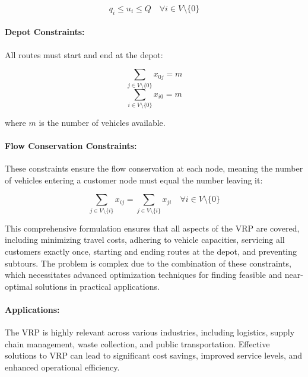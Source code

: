\documentclass{article}
\begin{document}
    \begin{equation}
        q_i \leq u_i \leq Q \quad \forall i \in V \setminus \{0\}
    \end{equation}

    \paragraph{Depot Constraints:}
    All routes must start and end at the depot:

    \begin{equation}
        \sum_{j \in V \setminus \{0\}} x_{0j} = m
    \end{equation}
    \begin{equation}
        \sum_{i \in V \setminus \{0\}} x_{i0} = m
    \end{equation}

    where \( m \) is the number of vehicles available. \cite[pp. 3--5, 62--65]{toth2014vehicle}

    \paragraph{Flow Conservation Constraints:}
    These constraints ensure the flow conservation at each node, meaning the number of vehicles entering a customer node must equal the number leaving it:

    \begin{equation}
        \sum_{j \in V \setminus \{i\}} x_{ij} = \sum_{j \in V \setminus \{i\}} x_{ji} \quad \forall i \in V \setminus \{0\}
    \end{equation}

    This comprehensive formulation ensures that all aspects of the VRP are covered, including minimizing travel costs, adhering to vehicle capacities, servicing all customers exactly once, starting and ending routes at the depot, and preventing subtours. The problem is complex due to the combination of these constraints, which necessitates advanced optimization techniques for finding feasible and near-optimal solutions in practical applications. \cite[pp. 3-5, 62-65]{toth2014vehicle}

    \paragraph{Applications:}
    The VRP is highly relevant across various industries, including logistics, supply chain management, waste collection, and public transportation. Effective solutions to VRP can lead to significant cost savings, improved service levels, and enhanced operational efficiency. \cite{konstantakopoulos2022vehicle}
\end{document}
